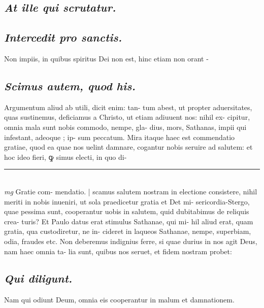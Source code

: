 \documentclass{article}
\begin{document}
\begin{pages}
\subsection*{\textit{At ille qui scrutatur. }}
{}
\subsection*{\textit{Intercedit pro sanctis. }}\pstart Non impiis, in quibus spiritus Dei non est, hinc etiam non orant -  \pend
{}
{}
\subsection*{\textit{Scimus autem, quod his. }}\pstart Argumentum aliud ab utili, dicit enim: tan- tum abest, ut propter aduersitates, quas sustinemus, deficiamus a Christo, ut etiam adiuuent nos: nihil ex- cipitur, omnia mala sunt nobis commodo, nempe, gla- dius, mors, Sathanas, impii qui infestant, adeoque ; ip- sum peccatum. Mira itaque haec est commendatio gratiae, quod ea quae nos uelint damnare, cogantur nobis seruire ad salutem: et hoc ideo fieri, ꝙ simus electi, in quo di-  \pend
\vspace{0.5cm}\noindent
\vspace{0.2cm}\rule{1cm}{0.2pt}\\ 
\hspace{0.2cm}\textit{mg}
\footnotesize Gratie com- mendatio. 
\normalsize| 
\marginpar{[ p.N 4 ]}
\marginpar{[ p.]}\pstart scamus salutem nostram in electione consistere, nihil meriti in nobis inueniri, ut sola praedicetur gratia et Det mi- sericordia-Stergo, quae pessima sunt, cooperantur uobis in salutem, quid dubitabimus de reliquis crea- turis? Et Paulo datus erat stimulus Sathanae, qui mi- hil aliud erat, quam gratia, qua custodiretur, ne in- cideret in laqueos Sathanae, nempe, superbiam, odia, fraudes etc. Non deberemus indignius ferre, si quae durius in nos agit Deus, nam haec omnia ta- lia sunt, quibus nos seruet, et fidem nostram probet:  \pend
{}
{}
\subsection*{\textit{Qui diligunt. }}\pstart Nam qui odiunt Deum, omnia eis cooperantur in malum et damnationem.  \pend
{}
{}

\end{pages}
\end{document}
